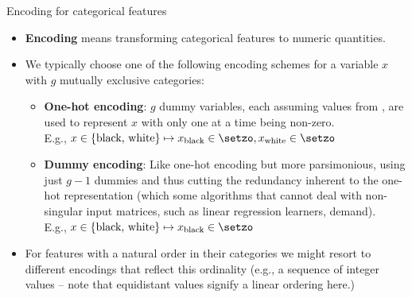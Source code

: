 \begin{vbframe}{Encoding for categorical features}

\begin{itemize}
  \small
  \item \textbf{Encoding} means transforming categorical 
  features to numeric quantities.
  \item We typically choose one of the following encoding schemes for a variable 
  $x$ with $g$ mutually exclusive categories:
  \begin{itemize}
    \small
    \item \textbf{One-hot encoding}: $g$ dummy variables, each assuming values 
    from \setzo, are used to represent $x$ with only one at a time being 
    non-zero. \\
    E.g., $x \in \{ \text{black, white}\} \mapsto x_{\text{black}} 
    \in \setzo, x_{\text{white}} \in \setzo$
    \item \textbf{Dummy encoding}: Like one-hot encoding but more parsimonious, 
    using just $g - 1$ dummies and thus cutting the redundancy inherent to the 
    one-hot representation (which some algorithms that cannot deal with 
    non-singular input matrices, such as linear regression learners, demand). \\
    E.g., $x \in \{ \text{black, white}\} \mapsto x_{\text{black}} \in \setzo$
  \end{itemize}
  \item For features with a natural order in their categories we might resort 
  to different encodings that reflect this ordinality (e.g., a sequence of 
  integer values -- note that equidistant values signify a linear ordering 
  here.)
\end{itemize}

\end{vbframe}


